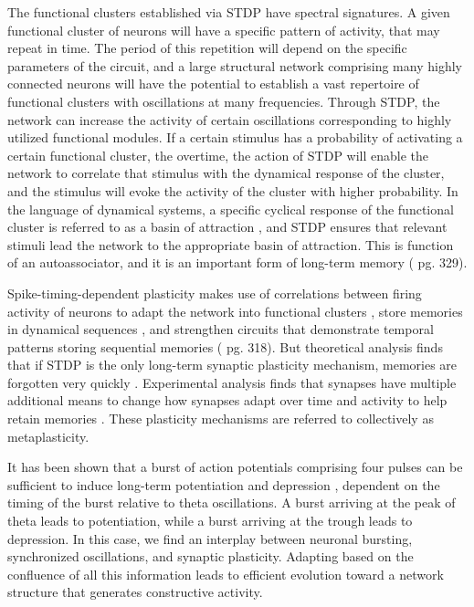 The functional clusters established via STDP have spectral signatures. A given functional cluster of neurons will have a specific pattern of activity, that may repeat in time. The period of this repetition will depend on the specific parameters of the circuit, and a large structural network comprising many highly connected neurons will have the potential to establish a vast repertoire of functional clusters with oscillations at many frequencies. Through STDP, the network can increase the activity of certain oscillations corresponding to highly utilized functional modules. If a certain stimulus has a probability of activating a certain functional cluster, the overtime, the action of STDP will enable the network to correlate that stimulus with the dynamical response of the cluster, and the stimulus will evoke the activity of the cluster with higher probability. In the language of dynamical systems, a specific cyclical response of the functional cluster is referred to as a basin of attraction \cite{iz2007,st2015}, and STDP ensures that relevant stimuli lead the network to the appropriate basin of attraction. This is function of an autoassociator, and it is an important form of long-term memory (\cite{bu2006} pg. 329).

Spike-timing-dependent plasticity makes use of correlations between firing activity of neurons to adapt the network into functional clusters \cite{shki2006}, store memories in dynamical sequences \cite{haah2015}, and strengthen circuits that demonstrate temporal patterns storing sequential memories (\cite{bu2006} pg. 318). But theoretical analysis finds that if STDP is the only long-term synaptic plasticity mechanism, memories are forgotten very quickly \cite{fuab2007}. Experimental analysis finds that synapses have multiple additional means to change how synapses adapt over time and activity to help retain memories \cite{ab2008}. These plasticity mechanisms are referred to collectively as metaplasticity.

It has been shown that a burst of action potentials comprising four pulses can be sufficient to induce long-term potentiation and depression \cite{huli1995}, dependent on the timing of the burst relative to theta oscillations. A burst arriving at the peak of theta leads to potentiation, while a burst arriving at the trough leads to depression. In this case, we find an interplay between neuronal bursting, synchronized oscillations, and synaptic plasticity. Adapting based on the confluence of all this information leads to efficient evolution toward a network structure that generates constructive activity.

